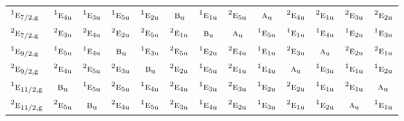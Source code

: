 \documentclass[10pt,a4paper]{article}
\numberwithin{equation}{section}
\newcommand{\irr}[1]{\text{\normalfont\scshape #1}}
\newcommand{\conjpair}[1]{{}^{#1}}
\newcommand{\ptag}[1]{\mathrm{#1}}
\begin{document}
{\begin{longtable}{@{}lcccccccccccc@{}}
$\conjpair{1}\irr{e}_{7/2,\ptag{g}}$ & $\conjpair{1}\irr{e}_{4\ptag{u}}$ & $\conjpair{1}\irr{e}_{3\ptag{u}}$ & $\conjpair{1}\irr{e}_{5\ptag{u}}$ & $\conjpair{1}\irr{e}_{2\ptag{u}}$ & $\irr{b}_{\ptag{u}}$ & $\conjpair{1}\irr{e}_{1\ptag{u}}$ & $\conjpair{2}\irr{e}_{5\ptag{u}}$ & $\irr{a}_{\ptag{u}}$ & $\conjpair{2}\irr{e}_{4\ptag{u}}$ & $\conjpair{2}\irr{e}_{1\ptag{u}}$ & $\conjpair{2}\irr{e}_{3\ptag{u}}$ & $\conjpair{2}\irr{e}_{2\ptag{u}}$\\
$\conjpair{2}\irr{e}_{7/2,\ptag{g}}$ & $\conjpair{2}\irr{e}_{3\ptag{u}}$ & $\conjpair{2}\irr{e}_{4\ptag{u}}$ & $\conjpair{2}\irr{e}_{2\ptag{u}}$ & $\conjpair{2}\irr{e}_{5\ptag{u}}$ & $\conjpair{2}\irr{e}_{1\ptag{u}}$ & $\irr{b}_{\ptag{u}}$ & $\irr{a}_{\ptag{u}}$ & $\conjpair{1}\irr{e}_{5\ptag{u}}$ & $\conjpair{1}\irr{e}_{1\ptag{u}}$ & $\conjpair{1}\irr{e}_{4\ptag{u}}$ & $\conjpair{1}\irr{e}_{2\ptag{u}}$ & $\conjpair{1}\irr{e}_{3\ptag{u}}$\\
$\conjpair{1}\irr{e}_{9/2,\ptag{g}}$ & $\conjpair{1}\irr{e}_{5\ptag{u}}$ & $\conjpair{1}\irr{e}_{4\ptag{u}}$ & $\irr{b}_{\ptag{u}}$ & $\conjpair{1}\irr{e}_{3\ptag{u}}$ & $\conjpair{2}\irr{e}_{5\ptag{u}}$ & $\conjpair{1}\irr{e}_{2\ptag{u}}$ & $\conjpair{2}\irr{e}_{4\ptag{u}}$ & $\conjpair{1}\irr{e}_{1\ptag{u}}$ & $\conjpair{2}\irr{e}_{3\ptag{u}}$ & $\irr{a}_{\ptag{u}}$ & $\conjpair{2}\irr{e}_{2\ptag{u}}$ & $\conjpair{2}\irr{e}_{1\ptag{u}}$\\
$\conjpair{2}\irr{e}_{9/2,\ptag{g}}$ & $\conjpair{2}\irr{e}_{4\ptag{u}}$ & $\conjpair{2}\irr{e}_{5\ptag{u}}$ & $\conjpair{2}\irr{e}_{3\ptag{u}}$ & $\irr{b}_{\ptag{u}}$ & $\conjpair{2}\irr{e}_{2\ptag{u}}$ & $\conjpair{1}\irr{e}_{5\ptag{u}}$ & $\conjpair{2}\irr{e}_{1\ptag{u}}$ & $\conjpair{1}\irr{e}_{4\ptag{u}}$ & $\irr{a}_{\ptag{u}}$ & $\conjpair{1}\irr{e}_{3\ptag{u}}$ & $\conjpair{1}\irr{e}_{1\ptag{u}}$ & $\conjpair{1}\irr{e}_{2\ptag{u}}$\\
$\conjpair{1}\irr{e}_{11/2,\ptag{g}}$ & $\irr{b}_{\ptag{u}}$ & $\conjpair{1}\irr{e}_{5\ptag{u}}$ & $\conjpair{2}\irr{e}_{5\ptag{u}}$ & $\conjpair{1}\irr{e}_{4\ptag{u}}$ & $\conjpair{2}\irr{e}_{4\ptag{u}}$ & $\conjpair{1}\irr{e}_{3\ptag{u}}$ & $\conjpair{2}\irr{e}_{3\ptag{u}}$ & $\conjpair{1}\irr{e}_{2\ptag{u}}$ & $\conjpair{2}\irr{e}_{2\ptag{u}}$ & $\conjpair{1}\irr{e}_{1\ptag{u}}$ & $\conjpair{2}\irr{e}_{1\ptag{u}}$ & $\irr{a}_{\ptag{u}}$\\
$\conjpair{2}\irr{e}_{11/2,\ptag{g}}$ & $\conjpair{2}\irr{e}_{5\ptag{u}}$ & $\irr{b}_{\ptag{u}}$ & $\conjpair{2}\irr{e}_{4\ptag{u}}$ & $\conjpair{1}\irr{e}_{5\ptag{u}}$ & $\conjpair{2}\irr{e}_{3\ptag{u}}$ & $\conjpair{1}\irr{e}_{4\ptag{u}}$ & $\conjpair{2}\irr{e}_{2\ptag{u}}$ & $\conjpair{1}\irr{e}_{3\ptag{u}}$ & $\conjpair{2}\irr{e}_{1\ptag{u}}$ & $\conjpair{1}\irr{e}_{2\ptag{u}}$ & $\irr{a}_{\ptag{u}}$ & $\conjpair{1}\irr{e}_{1\ptag{u}}$\\

\end{longtable}}
\end{document}
